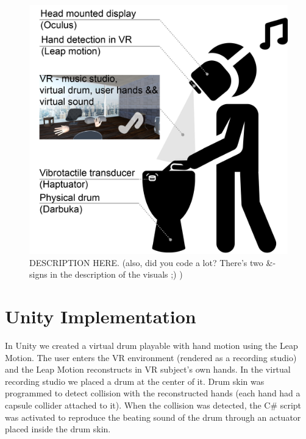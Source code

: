 \documentclass{vgtc}
\begin{document}
\begin{figure}[h]
\includegraphics[width=1.0\columnwidth]{VRDrumSetup.png}
\caption{DESCRIPTION HERE. (also, did you code a lot? There's two \&-signs in the description of the visuals ;) )}
\centering
\label{fig:userOverview}
\end{figure}


\section{Unity Implementation}\label{sec:unity}
In Unity we created a virtual drum playable with hand motion using the Leap Motion. The user enters the VR environment (rendered as a recording studio) and the Leap Motion reconstructs in VR subject's own hands. In the virtual recording studio we placed a drum at the center of it. Drum skin was programmed to detect collision with the reconstructed hands (each hand had a capsule collider attached to it). When the collision was detected, the C\# script was activated to reproduce the beating sound of the drum through an actuator placed inside the drum skin.
\end{document}

